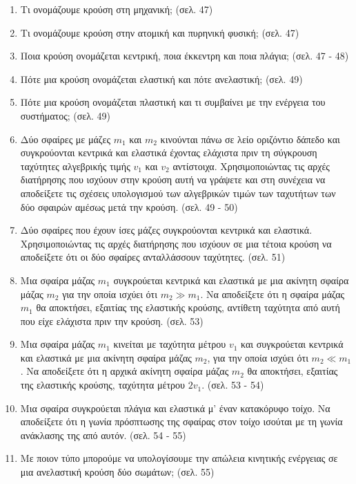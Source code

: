\documentclass{article}
\begin{document}
\begin{enumerate}
      \item Τι ονομάζουμε κρούση στη μηχανική; (σελ. 47)

      \item Τι ονομάζουμε κρούση στην ατομική και πυρηνική φυσική; (σελ. 47)

      \item Ποια κρούση ονομάζεται κεντρική, ποια έκκεντρη και ποια πλάγια; (σελ. 47 - 48)

      \item Πότε μια κρούση ονομάζεται ελαστική και πότε ανελαστική; (σελ. 49)

      \item Πότε μια κρούση ονομάζεται πλαστική και τι συμβαίνει με την ενέργεια του συστήματος; (σελ. 49)

      \item Δύο σφαίρες με μάζες $m_1$ και $m_2$ κινούνται πάνω σε λείο οριζόντιο δάπεδο και συγκρούονται κεντρικά και ελαστικά έχοντας ελάχιστα πριν τη σύγκρουση ταχύτητες αλγεβρικής τιμής $v_1$ και $v_2$ αντίστοιχα. Χρησιμοποιώντας τις αρχές διατήρησης που ισχύουν στην κρούση αυτή να γράψετε και στη συνέχεια να αποδείξετε τις σχέσεις υπολογισμού των αλγεβρικών τιμών των ταχυτήτων των δύο σφαιρών αμέσως μετά την κρούση. (σελ. 49 - 50)

      \item Δύο σφαίρες που έχουν ίσες μάζες συγκρούονται κεντρικά και ελαστικά. Χρησιμοποιώντας τις αρχές διατήρησης που ισχύουν σε μια τέτοια κρούση να αποδείξετε ότι οι δύο σφαίρες ανταλλάσσουν ταχύτητες. (σελ. 51)

      \item Μια σφαίρα μάζας $m_1$ συγκρούεται κεντρικά και ελαστικά με μια ακίνητη σφαίρα μάζας $m_2$ για την οποία ισχύει ότι $m_2 \gg m_1$. Να αποδείξετε ότι η σφαίρα μάζας $m_1$ θα αποκτήσει, εξαιτίας της ελαστικής κρούσης, αντίθετη ταχύτητα από αυτή που είχε ελάχιστα πριν την κρούση. (σελ. 53)

      \item Μια σφαίρα μάζας $m_1$ κινείται με ταχύτητα μέτρου $v_1$ και συγκρούεται κεντρικά και ελαστικά με μια ακίνητη σφαίρα μάζας $m_2$, για την οποία ισχύει ότι $m_2 \ll m_1$. Να αποδείξετε ότι η αρχικά ακίνητη σφαίρα μάζας $m_2$ θα αποκτήσει, εξαιτίας της ελαστικής κρούσης, ταχύτητα μέτρου $2v_1$. (σελ. 53 - 54)

      \item Μια σφαίρα συγκρούεται πλάγια και ελαστικά μ' έναν κατακόρυφο τοίχο. Να αποδείξετε ότι η γωνία πρόσπτωσης της σφαίρας στον τοίχο ισούται με τη γωνία ανάκλασης της από αυτόν. (σελ. 54 - 55)

      \item Με ποιον τύπο μπορούμε να υπολογίσουμε την απώλεια κινητικής ενέργειας σε μια ανελαστική κρούση δύο σωμάτων; (σελ. 55)
\end{enumerate}
\end{document}
